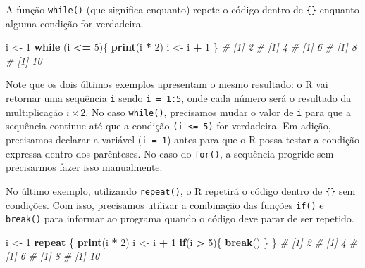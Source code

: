 \documentclass[
]{book}
\newenvironment{Shaded}{\begin{snugshade}}{\end{snugshade}}
\newcommand{\CommentTok}[1]{\textcolor[rgb]{0.56,0.35,0.01}{\textit{#1}}}
\newcommand{\ControlFlowTok}[1]{\textcolor[rgb]{0.13,0.29,0.53}{\textbf{#1}}}
\newcommand{\DecValTok}[1]{\textcolor[rgb]{0.00,0.00,0.81}{#1}}
\newcommand{\KeywordTok}[1]{\textcolor[rgb]{0.13,0.29,0.53}{\textbf{#1}}}
\newcommand{\NormalTok}[1]{#1}
\newcommand{\OperatorTok}[1]{\textcolor[rgb]{0.81,0.36,0.00}{\textbf{#1}}}
\newcommand{\StringTok}[1]{\textcolor[rgb]{0.31,0.60,0.02}{#1}}
\numberwithin{equation}{section}
\begin{document}
A função \texttt{while()} (que significa enquanto) repete o código dentro de \texttt{\{\}} enquanto alguma condição for verdadeira.

\begin{Shaded}
\begin{Highlighting}[]
\NormalTok{i \textless{}{-}}\StringTok{ }\DecValTok{1}
\ControlFlowTok{while}\NormalTok{ (i }\OperatorTok{\textless{}=}\StringTok{ }\DecValTok{5}\NormalTok{)\{}
  \KeywordTok{print}\NormalTok{(i }\OperatorTok{*}\StringTok{ }\DecValTok{2}\NormalTok{)}
\NormalTok{  i \textless{}{-}}\StringTok{ }\NormalTok{i }\OperatorTok{+}\StringTok{ }\DecValTok{1}
\NormalTok{\}}
\CommentTok{\# [1] 2}
\CommentTok{\# [1] 4}
\CommentTok{\# [1] 6}
\CommentTok{\# [1] 8}
\CommentTok{\# [1] 10}
\end{Highlighting}
\end{Shaded}

Note que os dois últimos exemplos apresentam o mesmo resultado: o R vai retornar uma sequência \texttt{i} sendo \texttt{i\ =\ 1:5}, onde cada número será o resultado da multiplicação \(i \times 2\). No caso \texttt{while()}, precisamos mudar o valor de \texttt{i} para que a sequência continue até que a condição \texttt{(i\ \textless{}=\ 5)} for verdadeira. Em adição, precisamos declarar a variável (\texttt{i\ =\ 1}) antes para que o R possa testar a condição expressa dentro dos parênteses. No caso do \texttt{for()}, a sequência progride sem precisarmos fazer isso manualmente.

No último exemplo, utilizando \texttt{repeat()}, o R repetirá o código dentro de \texttt{\{\}} sem condições. Com isso, precisamos utilizar a combinação das funções \texttt{if()} e \texttt{break()} para informar ao programa quando o código deve parar de ser repetido.

\begin{Shaded}
\begin{Highlighting}[]
\NormalTok{i \textless{}{-}}\StringTok{ }\DecValTok{1}
\ControlFlowTok{repeat}\NormalTok{ \{}
  \KeywordTok{print}\NormalTok{(i }\OperatorTok{*}\StringTok{ }\DecValTok{2}\NormalTok{)}
\NormalTok{  i \textless{}{-}}\StringTok{ }\NormalTok{i }\OperatorTok{+}\StringTok{ }\DecValTok{1}
  \ControlFlowTok{if}\NormalTok{(i }\OperatorTok{\textgreater{}}\StringTok{ }\DecValTok{5}\NormalTok{)\{}
    \ControlFlowTok{break}\NormalTok{()}
\NormalTok{  \}}
\NormalTok{\}}
\CommentTok{\# [1] 2}
\CommentTok{\# [1] 4}
\CommentTok{\# [1] 6}
\CommentTok{\# [1] 8}
\CommentTok{\# [1] 10}
\end{Highlighting}
\end{Shaded}
\end{document}
